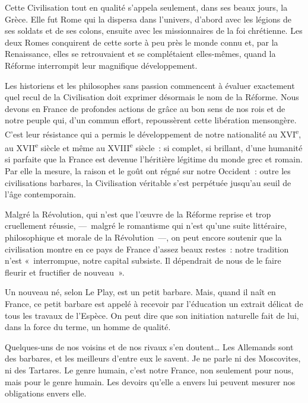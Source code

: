 \documentclass[french,twoside]{book} %
\newcommand{\astermono}{\medskip\centerline{\color{rubric}\large\selectfont{\syms ✻}}\medskip\par}%
\begin{document}
Cette Civilisation tout en qualité s’appela seulement, dans ses beaux jours, la Grèce. Elle fut Rome qui la dispersa dans l’univers, d’abord avec les légions de ses soldats et de ses colons, ensuite avec les missionnaires de la foi chrétienne. Les deux Romes conquirent de cette sorte à peu près le monde connu et, par la Renaissance, elles se retrouvaient et se complétaient elles-mêmes, quand la Réforme interrompit leur magnifique développement.\par
Les historiens et les philosophes sans passion commencent à évaluer exactement quel recul de la Civilisation doit exprimer désormais le nom de la Réforme. Nous devons en France de profondes actions de grâce au bon sens de nos rois et de notre peuple qui, d’un commun effort, repoussèrent cette libération mensongère. C’est leur résistance qui a permis le développement de notre nationalité au XVI\textsuperscript{e}, au XVII\textsuperscript{e} siècle et même au XVIII\textsuperscript{e} siècle : si complet, si brillant, d’une humanité si parfaite que la France est devenue l’héritière légitime du monde grec et romain. Par elle la mesure, la raison et le goût ont régné sur notre Occident : outre les civilisations barbares, la Civilisation véritable s’est perpétuée jusqu’au seuil de l’âge contemporain.\par
Malgré la Révolution, qui n’est que l’œuvre de la Réforme reprise et trop cruellement réussie, — malgré le romantisme qui n’est qu’une suite littéraire, philosophique et morale de la Révolution —, on peut encore soutenir que la civilisation montre en ce pays de France d’assez beaux restes : notre tradition n’est « interrompue, notre capital subsiste. Il dépendrait de nous de le faire fleurir et fructifier de nouveau ».\par
Un nouveau né, selon Le Play, est un petit barbare. Mais, quand il naît en France, ce petit barbare est appelé à recevoir par l’éducation un extrait délicat de tous les travaux de l’Espèce. On peut dire que son initiation naturelle fait de lui, dans la force du terme, un homme de qualité.\par
Quelques-uns de nos voisins et de nos rivaux s’en doutent… Les Allemands sont des barbares, et les meilleurs d’entre eux le savent. Je ne parle ni des Moscovites, ni des Tartares. Le genre humain, c’est notre France, non seulement pour nous, mais pour le genre humain. Les devoirs qu’elle a envers lui peuvent mesurer nos obligations envers elle.\par

\astermono
\end{document}
